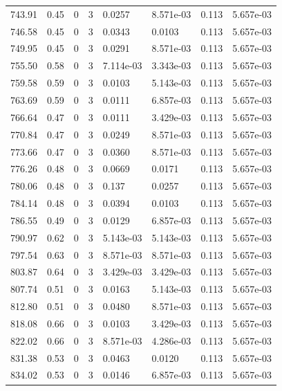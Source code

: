 \documentclass[preview]{standalone}
\begin{document}
{{{{{{\begin{tabular}{L{1.2cm}C{1.2cm} C{0.3cm}C{0.5cm} C{1.4cm}C{1.4cm} C{1.4cm}C{1.4cm}}
  743.91  &  0.45  & 0     &  3 &  0.0257  & 8.571e-03  & 0.113 &  5.657e-03   \\ 
  746.58  &  0.45  & 0     &  3 &  0.0343  & 0.0103  & 0.113 &  5.657e-03   \\ 
  749.95  &  0.45  & 0     &  3 &  0.0291  & 8.571e-03  & 0.113 &  5.657e-03   \\ 
  755.50  &  0.58  & 0     &  3 &  7.114e-03  & 3.343e-03  & 0.113 &  5.657e-03   \\ 
  759.58  &  0.59  & 0     &  3 &  0.0103  & 5.143e-03  & 0.113 &  5.657e-03   \\ 
  763.69  &  0.59  & 0     &  3 &  0.0111  & 6.857e-03  & 0.113 &  5.657e-03   \\ 
  766.64  &  0.47  & 0     &  3 &  0.0111  & 3.429e-03  & 0.113 &  5.657e-03   \\ 
  770.84  &  0.47  & 0     &  3 &  0.0249  & 8.571e-03  & 0.113 &  5.657e-03   \\ 
  773.66  &  0.47  & 0     &  3 &  0.0360  & 8.571e-03  & 0.113 &  5.657e-03   \\ 
  776.26  &  0.48  & 0     &  3 &  0.0669  & 0.0171  & 0.113 &  5.657e-03   \\ 
  780.06  &  0.48  & 0     &  3 &  0.137  & 0.0257  & 0.113 &  5.657e-03   \\ 
  784.14  &  0.48  & 0     &  3 &  0.0394  & 0.0103  & 0.113 &  5.657e-03   \\ 
  786.55  &  0.49  & 0     &  3 &  0.0129  & 6.857e-03  & 0.113 &  5.657e-03   \\ 
  790.97  &  0.62  & 0     &  3 &  5.143e-03  & 5.143e-03  & 0.113 &  5.657e-03   \\ 
  797.54  &  0.63  & 0     &  3 &  8.571e-03  & 8.571e-03  & 0.113 &  5.657e-03   \\ 
  803.87  &  0.64  & 0     &  3 &  3.429e-03  & 3.429e-03  & 0.113 &  5.657e-03   \\ 
  807.74  &  0.51  & 0     &  3 &  0.0163  & 5.143e-03  & 0.113 &  5.657e-03   \\ 
  812.80  &  0.51  & 0     &  3 &  0.0480  & 8.571e-03  & 0.113 &  5.657e-03   \\ 
  818.08  &  0.66  & 0     &  3 &  0.0103  & 3.429e-03  & 0.113 &  5.657e-03   \\ 
  822.02  &  0.66  & 0     &  3 &  8.571e-03  & 4.286e-03  & 0.113 &  5.657e-03   \\ 
  831.38  &  0.53  & 0     &  3 &  0.0463  & 0.0120  & 0.113 &  5.657e-03   \\ 
  834.02  &  0.53  & 0     &  3 &  0.0146  & 6.857e-03  & 0.113 &  5.657e-03   \\ 

\end{tabular}}}}}}}
\end{document}
